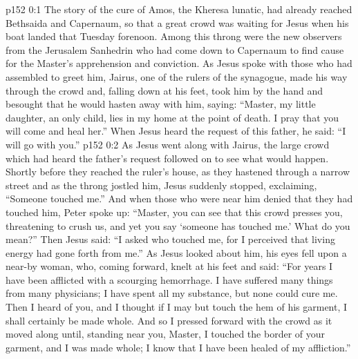 \author{Midwayer Commission}
\vs p152 0:1 The story of the cure of Amos, the Kheresa lunatic, had already reached Bethsaida and Capernaum, so that a great crowd was waiting for Jesus when his boat landed that Tuesday forenoon. Among this throng were the new observers from the Jerusalem Sanhedrin who had come down to Capernaum to find cause for the Master’s apprehension and conviction. As Jesus spoke with those who had assembled to greet him, Jairus, one of the rulers of the synagogue, made his way through the crowd and, falling down at his feet, took him by the hand and besought that he would hasten away with him, saying: “Master, my little daughter, an only child, lies in my home at the point of death. I pray that you will come and heal her.” When Jesus heard the request of this father, he said: \textcolor{ubdarkred}{“I will go with you.”}
\vs p152 0:2 As Jesus went along with Jairus, the large crowd which had heard the father’s request followed on to see what would happen. Shortly before they reached the ruler’s house, as they hastened through a narrow street and as the throng jostled him, Jesus suddenly stopped, exclaiming, \textcolor{ubdarkred}{“Someone touched me.”} And when those who were near him denied that they had touched him, Peter spoke up: “Master, you can see that this crowd presses you, threatening to crush us, and yet you say ‘someone has touched me.’ What do you mean?” Then Jesus said: \textcolor{ubdarkred}{“I asked who touched me, for I perceived that living energy had gone forth from me.”} As Jesus looked about him, his eyes fell upon a near\hyp{}by woman, who, coming forward, knelt at his feet and said: “For years I have been afflicted with a scourging hemorrhage. I have suffered many things from many physicians; I have spent all my substance, but none could cure me. Then I heard of you, and I thought if I may but touch the hem of his garment, I shall certainly be made whole. And so I pressed forward with the crowd as it moved along until, standing near you, Master, I touched the border of your garment, and I was made whole; I know that I have been healed of my affliction.”
